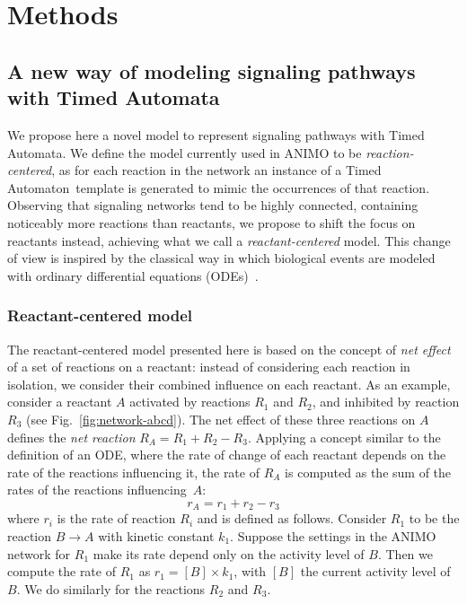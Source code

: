 \documentclass{bmcart}
\def\ta{Timed Automaton}
\def\tas{Timed Automata}
\begin{document}
\section*{Methods}

\subsection*{A new way of modeling signaling pathways with \tas}\label{sec:animo-new}
We propose here a novel model to represent signaling pathways with \tas.
We define the model currently used in ANIMO to be \emph{reaction-centered}, as for each reaction
in the network an instance of a \ta\ template is generated to mimic
the occurrences of that reaction. Observing that signaling
networks tend to be highly connected, containing noticeably more reactions than reactants,
we propose to shift the focus on reactants instead, achieving what we call a \emph{reactant-centered} model.
This change of view is inspired by the classical way in which biological events are modeled
with ordinary differential equations (ODEs)~\cite{ode-ma-anche-altro}.




\subsubsection*{Reactant-centered model}\label{sec:reactant-centered}
The reactant-centered model presented here is based on the concept of \emph{net effect} of a set of reactions on a reactant:
instead of considering each reaction in isolation, we consider their combined influence on each reactant.
As an example, consider a reactant $A$ activated by reactions $R_1$ and $R_2$, and inhibited
by reaction $R_3$ (see Fig.~\ref{fig:network-abcd}).
The net effect of these three reactions on $A$ defines the \emph{net reaction} $R_A = R_1 + R_2 - R_3.$
Applying a concept similar to the definition of an ODE,
where the rate of change of each reactant depends on the rate of the reactions influencing it,
the rate of $R_A$ is computed as the sum of the rates of the reactions influencing~$A$: 
$$r_A = r_1 + r_2 - r_3$$
where $r_i$ is the rate of reaction $R_i$ and is defined as follows.
Consider $R_1$ to be the reaction $B \rightarrow A$ with kinetic constant $k_1$.
Suppose the settings in the ANIMO network for $R_1$ make its rate depend only on the
activity level of $B$. Then we compute the rate of $R_1$ as $r_1 = [B] \times k_1$, with
$[B]$ the current activity level of $B$. We do similarly for the reactions $R_2$ and $R_3$.
\end{document}
